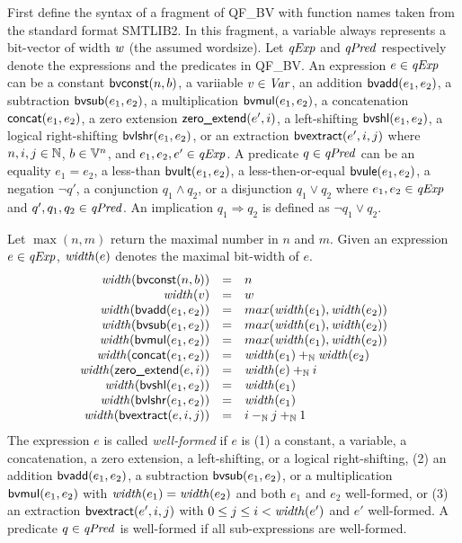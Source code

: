 
First define the syntax of a fragment of QF\_BV with function names taken from the standard format SMTLIB2.
In this fragment, a variable always represents a bit-vector of width $\mathit{w}$ (the assumed wordsize).
Let $\mathit{qExp}$ and $\mathit{qPred}$ respectively denote the expressions and the predicates in QF\_BV.
An expression $e \in \mathit{qExp}$ can be a constant $\mbox{\textsf{bvconst}}(n, b)$, a variiable $v \in \mathit{Var}$, an addition $\mbox{\textsf{bvadd}}(e_1, e_2)$, a subtraction $\mbox{\textsf{bvsub}}(e_1, e_2)$, a multiplication $\mbox{\textsf{bvmul}}(e_1, e_2)$, a concatenation $\mbox{\textsf{concat}}(e_1, e_2)$, a zero extension $\mbox{\textsf{zero\_extend}}(e', i)$, a left-shifting $\mbox{\textsf{bvshl}}(e_1, e_2)$, a logical right-shifting $\mbox{\textsf{bvlshr}}(e_1, e_2)$, or an extraction $\mbox{\textsf{bvextract}}(e', i, j)$ where $n, i, j \in \mathbb{N}$, $b \in \mathbb{V}^n$, and $e_1, e_2, e' \in \mathit{qExp}$.
A predicate $q \in \mathit{qPred}$ can be an equality $e_1 = e_2$, a less-than $\mbox{\textsf{bvult}}(e_1, e_2)$, a less-then-or-equal $\mbox{\textsf{bvule}}(e_1, e_2)$, a negation $\neg q'$, a conjunction $q_1 \wedge q_2$, or a disjunction $q_1 \vee q_2$ where $e_1, e_2 \in \mathit{qExp}$ and $q', q_1, q_2 \in \mathit{qPred}$.
An implication $q_1 \Rightarrow q_2$ is defined as $\neg q_1 \vee q_2$.

Let $\max(n, m)$ return the maximal number in $n$ and $m$.
Given an expression $e \in \mathit{qExp}$, $\mathit{width}(e)$ denotes the maximal bit-width of $e$.
\[
\begin{array}{rcl}
\mathit{width}(\mbox{\textsf{bvconst}}(n, b)) & = & n \\
\mathit{width}(v) & = & w \\
\mathit{width}(\mbox{\textsf{bvadd}}(e_1, e_2)) & = & max(\mathit{width}(e_1), \mathit{width}(e_2))\\
\mathit{width}(\mbox{\textsf{bvsub}}(e_1, e_2)) & = & max(\mathit{width}(e_1), \mathit{width}(e_2))\\
\mathit{width}(\mbox{\textsf{bvmul}}(e_1, e_2)) & = & max(\mathit{width}(e_1), \mathit{width}(e_2))\\
\mathit{width}(\mbox{\textsf{concat}}(e_1, e_2)) & = & \mathit{width}(e_1) +_{\mathbb{N}} \mathit{width}(e_2)\\
\mathit{width}(\mbox{\textsf{zero\_extend}}(e, i)) & = & \mathit{width}(e) +_{\mathbb{N}} i \\
\mathit{width}(\mbox{\textsf{bvshl}}(e_1, e_2)) & = & \mathit{width}(e_1) \\
\mathit{width}(\mbox{\textsf{bvlshr}}(e_1, e_2)) & = & \mathit{width}(e_1) \\
\mathit{width}(\mbox{\textsf{bvextract}}(e, i, j)) & = & i -_{\mathbb{N}} j +_{\mathbb{N}} 1 \\
\end{array}
\]
The expression $e$ is called \emph{well-formed} if $e$ is (1) a constant, a variable, a concatenation, a zero extension, a left-shifting, or a logical right-shifting, (2) an addition $\mbox{\textsf{bvadd}}(e_1, e_2)$, a subtraction $\mbox{\textsf{bvsub}}(e_1, e_2)$, or a multiplication $\mbox{\textsf{bvmul}}(e_1, e_2)$ with $\mathit{width}(e_1) = \mathit{width}(e_2)$ and both $e_1$ and $e_2$ well-formed, or (3) an extraction $\mbox{\textsf{bvextract}}(e', i, j)$ with $0 \leq j \leq i < \mathit{width}(e')$ and $e'$ well-formed.
A predicate $q \in \mathit{qPred}$ is well-formed if all sub-expressions are well-formed.

